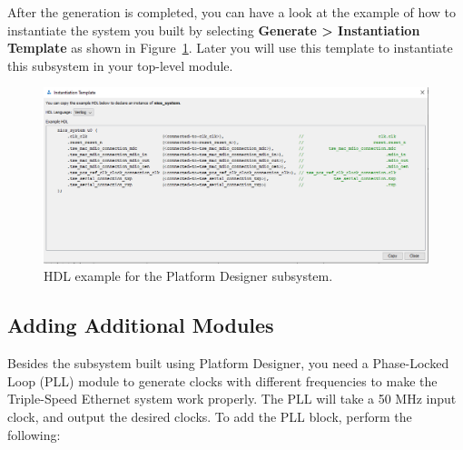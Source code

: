 \documentclass[11pt, twoside, pdftex]{article}
\begin{document}
After the generation is completed, you can have a look at the example of how to instantiate the system you built by selecting {\bf Generate > Instantiation Template} as shown in Figure~\ref{fig:hdl_example}. Later you will use this template to instantiate this subsystem in your top-level module. 

		\begin{figure}[H]
			\centering
			  \includegraphics[scale=0.5]{figures/inst_template.PNG}
			\caption{HDL example for the Platform Designer subsystem.} 
			\label{fig:hdl_example}
		\end{figure}

\subsection{Adding Additional Modules}
Besides the subsystem built using Platform Designer, you need a Phase-Locked Loop (PLL) module to generate clocks with different frequencies to make the Triple-Speed Ethernet system work properly. The PLL will take a 50 MHz input clock, and output the desired clocks. To add the PLL block, perform the following:
\end{document}
